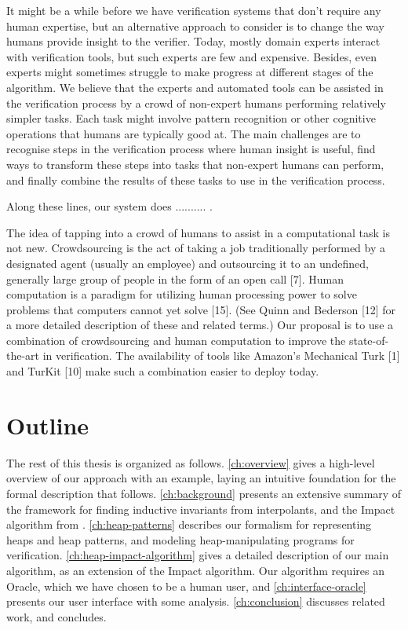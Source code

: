 It might be a while before we have verification systems that don't require any human expertise, but an alternative approach to consider is to change the way humans provide insight to the verifier. Today, mostly domain experts interact with verification tools, but such experts are few and expensive. Besides, even experts might sometimes struggle to make progress at different stages of the algorithm. We believe that the experts and automated tools can be assisted in the verification process by a crowd of non-expert humans performing relatively simpler tasks. Each task might involve pattern recognition or other cognitive operations that humans are typically good at. The main challenges are to recognise steps in the verification process where human insight is useful, find ways to transform these steps into tasks that non-expert humans can perform, and finally combine the results of these tasks to use in the verification process.

Along these lines, our system does .......... .

The idea of tapping into a crowd of humans to assist in a computational
task is not new. Crowdsourcing is the act of taking a
job traditionally performed by a designated agent (usually an employee)
and outsourcing it to an undefined, generally large group
of people in the form of an open call [7]. Human computation is a
paradigm for utilizing human processing power to solve problems
that computers cannot yet solve [15]. (See Quinn and Bederson [12]
for a more detailed description of these and related terms.) Our proposal
is to use a combination of crowdsourcing and human computation
to improve the state-of-the-art in verification. The availability
of tools like Amazon’s Mechanical Turk [1] and TurKit [10] make
such a combination easier to deploy today.

\section{Outline}

The rest of this thesis is organized as follows. \autoref{ch:overview} gives a high-level overview of our approach with an example, laying an intuitive foundation for the formal description that follows. \autoref{ch:background} presents an extensive summary of the framework for finding inductive invariants from interpolants, and the Impact algorithm from \cite{mcmillan06}. \autoref{ch:heap-patterns} describes our formalism for representing heaps and heap patterns, and modeling heap-manipulating programs for verification. \autoref{ch:heap-impact-algorithm} gives a detailed description of our main algorithm, as an extension of the Impact algorithm. Our algorithm requires an Oracle, which we have chosen to be a human user, and \autoref{ch:interface-oracle} presents our user interface with some analysis. \autoref{ch:conclusion} discusses related work, and concludes.

